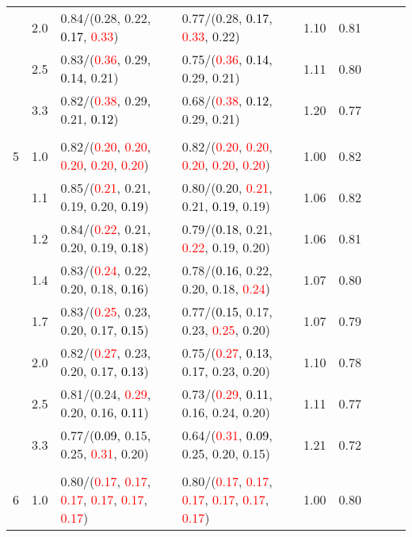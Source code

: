 \documentclass[10pt,a4paper]{report}
\begin{document}
\begin{table}[!htbp]
\begin{center}
{\begin{tabular}{ccllccccc}
			&2.0&0.84/(0.28, 0.22, \textcolor{black}{0.17}, \textcolor{red}{0.33})&0.77/(0.28, \textcolor{black}{0.17}, \textcolor{red}{0.33}, 0.22)&1.10&0.81\\
			&2.5&0.83/(\textcolor{red}{0.36}, 0.29, \textcolor{black}{0.14}, 0.21)&0.75/(\textcolor{red}{0.36}, \textcolor{black}{0.14}, 0.29, 0.21)&1.11&0.80\\
			&3.3&0.82/(\textcolor{red}{0.38}, 0.29, 0.21, \textcolor{black}{0.12})&0.68/(\textcolor{red}{0.38}, \textcolor{black}{0.12}, 0.29, 0.21)&1.20&0.77\\
			&&&&\\
			5			&1.0&0.82/(\textcolor{red}{0.20}, \textcolor{red}{0.20}, \textcolor{red}{0.20}, \textcolor{red}{0.20}, \textcolor{red}{0.20})&0.82/(\textcolor{red}{0.20}, \textcolor{red}{0.20}, \textcolor{red}{0.20}, \textcolor{red}{0.20}, \textcolor{red}{0.20})&1.00&0.82\\
			&1.1&0.85/(\textcolor{red}{0.21}, 0.21, 0.19, 0.20, \textcolor{black}{0.19})&0.80/(0.20, \textcolor{red}{0.21}, 0.21, \textcolor{black}{0.19}, 0.19)&1.06&0.82\\
			&1.2&0.84/(\textcolor{red}{0.22}, 0.21, 0.20, 0.19, \textcolor{black}{0.18})&0.79/(\textcolor{black}{0.18}, 0.21, \textcolor{red}{0.22}, 0.19, 0.20)&1.06&0.81\\
			&1.4&0.83/(\textcolor{red}{0.24}, 0.22, 0.20, 0.18, \textcolor{black}{0.16})&0.78/(\textcolor{black}{0.16}, 0.22, 0.20, 0.18, \textcolor{red}{0.24})&1.07&0.80\\
			&1.7&0.83/(\textcolor{red}{0.25}, 0.23, 0.20, 0.17, \textcolor{black}{0.15})&0.77/(\textcolor{black}{0.15}, 0.17, 0.23, \textcolor{red}{0.25}, 0.20)&1.07&0.79\\
			&2.0&0.82/(\textcolor{red}{0.27}, 0.23, 0.20, 0.17, \textcolor{black}{0.13})&0.75/(\textcolor{red}{0.27}, \textcolor{black}{0.13}, 0.17, 0.23, 0.20)&1.10&0.78\\
			&2.5&0.81/(0.24, \textcolor{red}{0.29}, 0.20, 0.16, \textcolor{black}{0.11})&0.73/(\textcolor{red}{0.29}, \textcolor{black}{0.11}, 0.16, 0.24, 0.20)&1.11&0.77\\
			&3.3&0.77/(\textcolor{black}{0.09}, 0.15, 0.25, \textcolor{red}{0.31}, 0.20)&0.64/(\textcolor{red}{0.31}, \textcolor{black}{0.09}, 0.25, 0.20, 0.15)&1.21&0.72\\
			&&&&\\
			6			&1.0&0.80/(\textcolor{red}{0.17}, \textcolor{red}{0.17}, \textcolor{red}{0.17}, \textcolor{red}{0.17}, \textcolor{red}{0.17}, \textcolor{red}{0.17})&0.80/(\textcolor{red}{0.17}, \textcolor{red}{0.17}, \textcolor{red}{0.17}, \textcolor{red}{0.17}, \textcolor{red}{0.17}, \textcolor{red}{0.17})&1.00&0.80\\

\end{tabular}}
\end{center}
\end{table}
\end{document}
